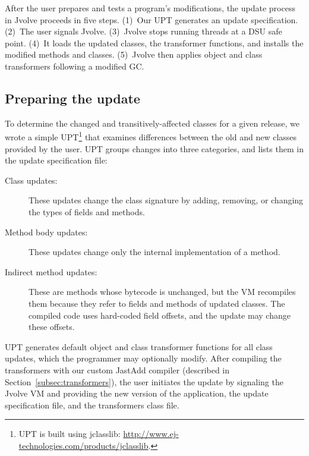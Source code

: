 \documentclass[9pt]{sigplanconf}
\newcommand{\DSU}{{\sc Jvolve}}
\begin{document}

After the user prepares and tests a program's modifications, the
update process in \DSU{} proceeds in five steps. 
(1)~Our UPT generates an update specification.  
(2)~The user signals \DSU{}.  (3)~\DSU{} stops running threads at a DSU safe point. (4)~It loads the
updated classes, the transformer functions,
and installs the modified methods and classes. (5)~\DSU{} then
applies object and class transformers following a modified GC\@.

\subsection{Preparing the update}
\label{sec:prep}

To determine the changed and transitively-affected classes for a given
release, we wrote a simple \acf{UPT}\footnote{\ac{UPT} is built using
jclasslib: \url{http://www.ej-technologies.com/products/jclasslib}.} that examines differences between
the old and new classes provided by the user.
\ac{UPT} groups changes into three categories, and lists them in the
update specification file:

\begin{description}
\item[Class updates:] These updates change the class signature by
  add\-ing, removing, or changing the types of fields and methods.
\item[Method body updates:] These updates change only the internal
implementation of a method. 
\item[Indirect method updates:] These are methods whose bytecode is
  unchanged, but the VM recompiles them because they
  refer to fields and methods of updated classes.   The compiled
  code uses hard-coded field offsets, and the update may change these offsets.
\end{description}

\noindent  \ac{UPT} generates default object and class transformer
functions for all class updates, which the programmer may optionally
modify.  After compiling the transformers with our custom JastAdd compiler
(described in Section~\ref{subsec:transformers}), the user initiates the update by signaling the
\DSU{} VM and providing the new version of the application, the 
update specification file, and the transformers class file.
\end{document}
